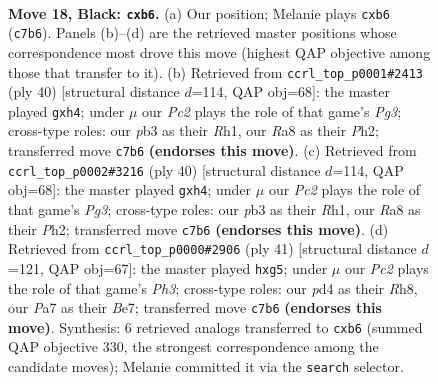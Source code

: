 \documentclass[11pt]{article}
\begin{document}
\begin{figure}[p]
\label{fig:thought-m33}
\end{figure}

\clearpage

\begin{figure}[p]\centering
\begin{subfigure}{0.46\textwidth}\centering
\resizebox{\linewidth}{!}{%
\newchessgame
\chessboard[
  setfen={rnb3k1/ppp5/1P2p1p1/3pP3/1P1P1rp1/1PN5/8/3QKBNR b K - 0 18},
  showmover=false,
  pgfstyle=straightmove, color=movearrow, markmove={c7-b6}
]}
\caption{}
\end{subfigure}\hfill
\begin{subfigure}{0.46\textwidth}\centering
\resizebox{\linewidth}{!}{%
\newchessgame
\chessboard[
  setfen={4k2r/1b1pbpp1/pN3n2/B3p3/4P2p/1Pp2PP1/P1P3BP/2K4R w k - 0 21},
  showmover=false,
  pgfstyle=straightmove, color=movearrow, markmove={g3-h4}
]}
\caption{}
\end{subfigure}
\\[4pt]
\begin{subfigure}{0.46\textwidth}\centering
\resizebox{\linewidth}{!}{%
\newchessgame
\chessboard[
  setfen={4k2r/1b1pbpp1/pN3n2/B3p3/4P2p/1Pp2PP1/P1P3BP/2K4R w k - 0 21},
  showmover=false,
  pgfstyle=straightmove, color=movearrow, markmove={g3-h4}
]}
\caption{}
\end{subfigure}\hfill
\begin{subfigure}{0.46\textwidth}\centering
\resizebox{\linewidth}{!}{%
\newchessgame
\chessboard[
  setfen={2b1k2r/4bp1p/p2pp2p/4n1P1/4P3/2N2P2/1PP5/R3KB1R b KQk - 0 21},
  showmover=false,
  pgfstyle=straightmove, color=movearrow, markmove={h6-g5}
]}
\caption{}
\end{subfigure}
\caption{\textbf{Move 18, Black: \texttt{cxb6}.} (a) Our position; Melanie plays \texttt{cxb6} (\texttt{c7b6}). Panels (b)--(d) are the retrieved master positions whose correspondence most drove this move (highest QAP objective among those that transfer to it). (b) Retrieved from \texttt{ccrl\_top\_p0001\#2413} (ply 40) [structural distance $d$=114, QAP obj=68]: the master played \texttt{gxh4}; under $\mu$ our \emph{Pc2} plays the role of that game's \emph{Pg3}; cross-type roles: our \emph{p}b3 as their \emph{R}h1, our \emph{R}a8 as their \emph{P}h2; transferred move \texttt{c7b6} \textbf{(endorses this move)}. (c) Retrieved from \texttt{ccrl\_top\_p0002\#3216} (ply 40) [structural distance $d$=114, QAP obj=68]: the master played \texttt{gxh4}; under $\mu$ our \emph{Pc2} plays the role of that game's \emph{Pg3}; cross-type roles: our \emph{p}b3 as their \emph{R}h1, our \emph{R}a8 as their \emph{P}h2; transferred move \texttt{c7b6} \textbf{(endorses this move)}. (d) Retrieved from \texttt{ccrl\_top\_p0000\#2906} (ply 41) [structural distance $d$=121, QAP obj=67]: the master played \texttt{hxg5}; under $\mu$ our \emph{Pc2} plays the role of that game's \emph{Ph3}; cross-type roles: our \emph{p}d4 as their \emph{R}h8, our \emph{P}a7 as their \emph{B}e7; transferred move \texttt{c7b6} \textbf{(endorses this move)}. Synthesis: 6 retrieved analogs transferred to \texttt{cxb6} (summed QAP objective 330, the strongest correspondence among the candidate moves); Melanie committed it via the \texttt{search} selector.}

\end{figure}
\end{document}
